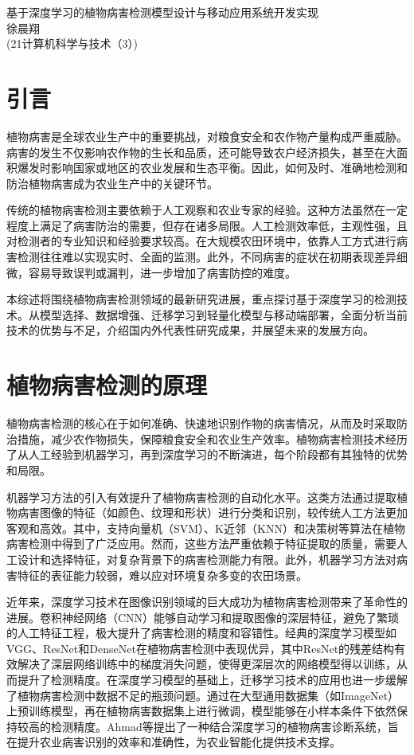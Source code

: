 \setcounter{page}{1}
\begin{center}
    \heiti {}基于深度学习的植物病害检测模型设计与移动应用系统开发实现\\
    \songti {}徐晨翔\\
    (21计算机科学与技术（3）)
\end{center}
\songti {}
\section{引言}
植物病害是全球农业生产中的重要挑战，对粮食安全和农作物产量构成严重威胁。病害的发生不仅影响农作物的生长和品质，还可能导致农户经济损失，甚至在大面积爆发时影响国家或地区的农业发展和生态平衡。因此，如何及时、准确地检测和防治植物病害成为农业生产中的关键环节。

传统的植物病害检测主要依赖于人工观察和农业专家的经验。这种方法虽然在一定程度上满足了病害防治的需要，但存在诸多局限。人工检测效率低，主观性强，且对检测者的专业知识和经验要求较高。在大规模农田环境中，依靠人工方式进行病害检测往往难以实现实时、全面的监测。此外，不同病害的症状在初期表现差异细微，容易导致误判或漏判，进一步增加了病害防控的难度。

本综述将围绕植物病害检测领域的最新研究进展，重点探讨基于深度学习的检测技术。从模型选择、数据增强、迁移学习到轻量化模型与移动端部署，全面分析当前技术的优势与不足，介绍国内外代表性研究成果，并展望未来的发展方向。

\section{植物病害检测的原理}
植物病害检测的核心在于如何准确、快速地识别作物的病害情况，从而及时采取防治措施，减少农作物损失，保障粮食安全和农业生产效率。植物病害检测技术经历了从人工经验到机器学习，再到深度学习的不断演进，每个阶段都有其独特的优势和局限。

机器学习方法的引入有效提升了植物病害检测的自动化水平。这类方法通过提取植物病害图像的特征（如颜色、纹理和形状）进行分类和识别，较传统人工方法更加客观和高效\cite{16}。其中，支持向量机（SVM）、K近邻（KNN）和决策树等算法在植物病害检测中得到了广泛应用。然而，这些方法严重依赖于特征提取的质量，需要人工设计和选择特征，对复杂背景下的病害检测能力有限。此外，机器学习方法对病害特征的表征能力较弱，难以应对环境复杂多变的农田场景\cite{17}。

近年来，深度学习技术在图像识别领域的巨大成功为植物病害检测带来了革命性的进展。卷积神经网络（CNN）能够自动学习和提取图像的深层特征，避免了繁琐的人工特征工程，极大提升了病害检测的精度和容错性。经典的深度学习模型如VGG、ResNet和DenseNet在植物病害检测中表现优异，其中ResNet的残差结构有效解决了深层网络训练中的梯度消失问题，使得更深层次的网络模型得以训练，从而提升了检测精度。在深度学习模型的基础上，迁移学习技术的应用也进一步缓解了植物病害检测中数据不足的瓶颈问题。通过在大型通用数据集（如ImageNet）上预训练模型，再在植物病害数据集上进行微调，模型能够在小样本条件下依然保持较高的检测精度。Ahmad等\cite{19}提出了一种结合深度学习的植物病害诊断系统，旨在提升农业病害识别的效率和准确性，为农业智能化提供技术支撑。

